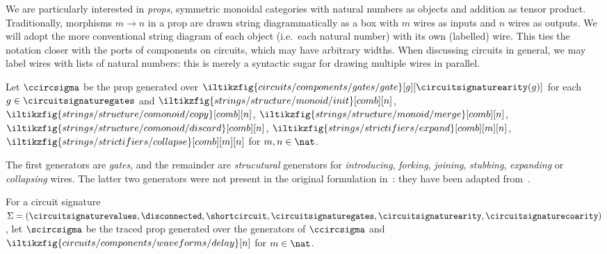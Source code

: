 We are particularly interested in \emph{props}, symmetric monoidal categories
with natural numbers as objects and addition as tensor product.
Traditionally, morphisms \(m \to n\) in a prop are drawn string diagrammatically
as a box with \(m\) wires as inputs and \(n\) wires as outputs.
We will adopt the more conventional string diagram of each object (i.e.\ each
natural number) with its own (labelled) wire.
This ties the notation closer with the ports of components on circuits,
which may have arbitrary widths.
When discussing circuits in general, we may label wires with lists of natural
numbers: this is merely a syntactic sugar for drawing multiple wires in parallel.


\begin{definition}
    Let \(\ccircsigma\) be the prop generated over \(
        \iltikzfig{circuits/components/gates/gate}[g][\circuitsignaturearity(g)]
    \) for each \(
        g \in \circuitsignaturegates
    \) and \(
        \iltikzfig{strings/structure/monoid/init}[comb][n]
    \), \(
        \iltikzfig{strings/structure/comonoid/copy}[comb][n]
    \), \(
        \iltikzfig{strings/structure/monoid/merge}[comb][n]
    \), \(
        \iltikzfig{strings/structure/comonoid/discard}[comb][n]
    \), \(
        \iltikzfig{strings/strictifiers/expand}[comb][m][n]
    \), \(
        \iltikzfig{strings/strictifiers/collapse}[comb][m][n]
    \) for \(m, n \in \nat\).
\end{definition}

The first generators are \emph{gates}, and the remainder are \emph{strucutural}
generators for \emph{introducing}, \emph{forking}, \emph{joining}, \emph{stubbing},
\emph{expanding} or \emph{collapsing} wires.
The latter two generators were not present in the original formulation
in~\cite{ghica2022compositional}: they have been adapted
from~\cite{wilson2022stringa}.

\begin{definition}
    For a circuit signature \(\Sigma = (
        \circuitsignaturevalues,
        \disconnected,
        \shortcircuit,
        \circuitsignaturegates,
        \circuitsignaturearity,
        \circuitsignaturecoarity
    )\), let \(\scircsigma\) be the traced prop generated
    over the generators of \(\ccircsigma\) and \(
        \iltikzfig{circuits/components/waveforms/delay}[n]
    \) for \(m \in \nat\).
\end{definition}

